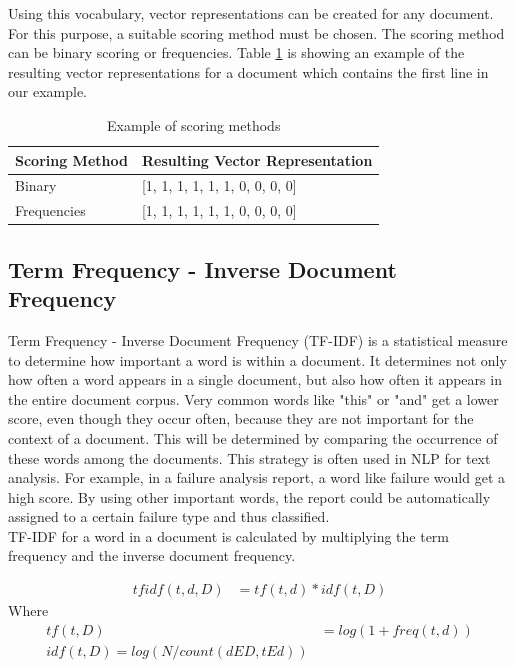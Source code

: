 Using this vocabulary, vector representations can be created for any document. For this purpose, a suitable scoring method must be chosen. The scoring method can be binary scoring or frequencies. Table \ref{tab:scoring} is showing an example of the resulting vector representations for a document which contains the first line in our example.

\begin{table}[H]
	\centering
	\begin{tabular}{ll}
		\hline
		\textbf{Scoring Method} & \textbf{Resulting Vector Representation}                                         \\ \hline
		Binary & [1, 1, 1, 1, 1, 1, 0, 0, 0, 0] \\ \hline
		Frequencies & [1, 1, 1, 1, 1, 1, 0, 0, 0, 0] \\ \hline
	\end{tabular}
	\caption{Example of scoring methods}
	\label{tab:scoring}
\end{table}

\subsection{Term Frequency - Inverse Document Frequency}
Term Frequency - Inverse Document Frequency (TF-IDF) is a statistical measure to determine how important a word is within a document. It determines not only how often a word appears in a single document, but also how often it appears in the entire document corpus. Very common words like "this" or "and" get a lower score, even though they occur often, because they are not important for the context of a document. This will be determined by comparing the occurrence of these words among the documents. This strategy is often used in NLP for text analysis. For example, in a failure analysis report, a word like failure would get a high score. By using other important words, the report could be automatically assigned to a certain failure type and thus classified. \\
TF-IDF for a word in a document is calculated by multiplying the term frequency and the inverse document frequency.

\begin{align}
	tf idf (t, d, D) &= tf(t, d) * idf(t, D)
\end{align}
Where
\begin{align}
	tf (t, D) &= log(1 + freq(t, d)) \\
	idf(t, D) = log(N/count(d E D, t E d))
\end{align}

